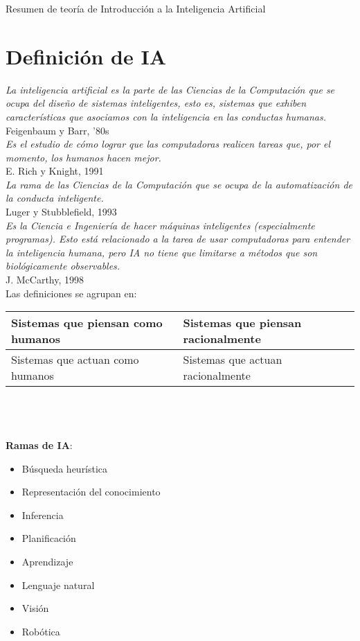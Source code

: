 \documentclass[a4paper,10pt]{paper}
\begin{document}
Resumen de teor\'ia de Introducci\'on a la Inteligencia Artificial

\section{Definición de IA}

\textit{La inteligencia artificial es la parte de las Ciencias de la Computación que
se ocupa del diseño de sistemas inteligentes, esto es, sistemas que exhiben
características que asociamos con la inteligencia en las conductas humanas.}\\
Feigenbaum y Barr, '80s\\

\textit{Es el estudio de cómo lograr que las computadoras realicen tareas que, por el
momento, los humanos hacen mejor.}\\
E. Rich y Knight, 1991\\

\textit{La rama de las Ciencias de la Computación que se ocupa de la automatización
de la conducta inteligente.}\\
Luger y Stubblefield, 1993\\

\textit{Es la Ciencia e Ingeniería de hacer máquinas inteligentes (especialmente
programas). Esto está relacionado a la tarea de usar computadoras para
entender la inteligencia humana, pero IA no tiene que limitarse a métodos
que son biológicamente observables.}\\
J. McCarthy, 1998\\

Las definiciones se agrupan en:\\
\begin{tabular}{| p{6cm} | p{6cm} |}
\hline
Sistemas que piensan como humanos &
Sistemas que piensan racionalmente \\
\hline
Sistemas que actuan como humanos &
Sistemas que actuan racionalmente \\
\hline
\end{tabular}
\\
\\
\\
\textbf{Ramas de IA}:
\begin{itemize}
    \item Búsqueda heurística
    \item Representación del conocimiento
    \item Inferencia
    \item Planificación
    \item Aprendizaje
    \item Lenguaje natural
    \item Visión
    \item Robótica
\end{itemize}
\end{document}

